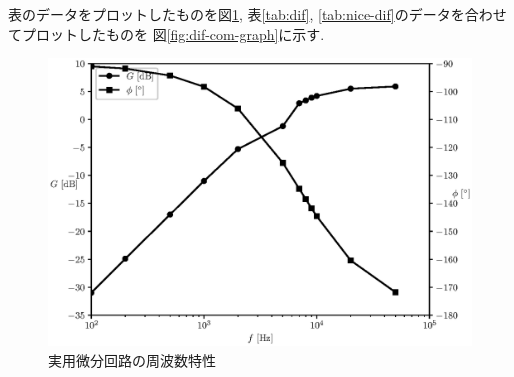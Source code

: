 \documentclass[titlepage]{jsarticle}
\begin{document}
            表のデータをプロットしたものを図\ref{fig:nice-dif-graph},
            表\ref{tab:dif}, \ref{tab:nice-dif}のデータを合わせてプロットしたものを
            図\ref{fig:dif-com-graph}に示す.

            \begin{figure}[h]
                \centering
                \includegraphics[width=0.8\hsize]{img/nice-dif-graph.eps}
                \caption{実用微分回路の周波数特性}
                \label{fig:nice-dif-graph}
            \end{figure}
\end{document}
